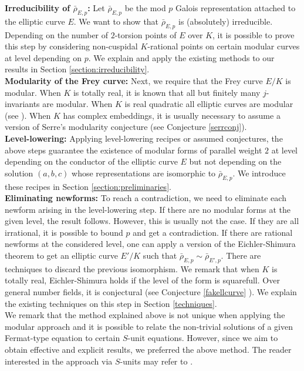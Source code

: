 \documentclass[]{article}
\begin{document}
\noindent\textbf{Irreducibility of $\bar{\rho}_{E, p}$: }Let $\bar{\rho}_{E, p}$ be the mod $p$ Galois representation attached to the elliptic curve $E$. We want to show that $\bar{\rho}_{E, p}$ is (absolutely) irreducible. Depending on the number of $2$-torsion points of $E$ over $K$, it is possible to prove this step by considering non-cuspidal $K$-rational points on certain modular curves at level depending on $p$. We explain and apply the existing methods to our results in Section \ref{section:irreducibility}.\\

\noindent\textbf{Modularity of the Frey curve: }Next, we require that the Frey curve $E/K$ is modular. When $K$ is totally real, it is known that all but finitely many $j$-invariants are modular. When $K$ is real quadratic all elliptic curves are modular (see \cite{freitas2015elliptic}). When $K$ has complex embeddings, it is usually necessary to assume a version of Serre's modularity conjecture (see Conjecture \ref{serrconj}).\\


\noindent\textbf{Level-lowering: }Applying level-lowering recipes or assumed conjectures, the above steps guarantee the existence of modular forms of parallel weight $2$ at level depending on the conductor of the elliptic curve $E$ but not depending on the solution $(a,b,c)$ whose representations are isomorphic to $\bar{\rho}_{E, p}$. We introduce these recipes in Section \ref{section:preliminaries}. \\

\noindent\textbf{Eliminating newforms: } To reach a contradiction, we need to eliminate each newform arising in the level-lowering step. If there are no modular forms at the given level, the result follows. However, this is usually not the case. If they are all irrational, it is possible to bound $p$ and get a contradiction. If there are rational newforms at the considered level, one can apply a version of the Eichler-Shimura theorem to get an elliptic curve $E'/K$ such that $\bar{\rho}_{E, p}\sim \bar{\rho}_{E', p}$. There are techniques to discard the previous isomorphism. We remark that when $K$ is totally real, Eichler-Shimura holds if the level of the form is squarefull. Over general number fields, it is conjectural (see Conjecture \ref{fakellcurve} ). We explain the existing techniques on this step in Section \ref{techniques}.\\

We remark that the method explained above is not unique when applying the modular approach and it is possible to relate the non-trivial solutions of a given Fermat-type equation to certain $S$-unit equations. However, since we aim to obtain effective and explicit results, we preferred the above method. The reader interested in the approach via $S$-units may refer to \cite{ozman2021s}.
\end{document}
